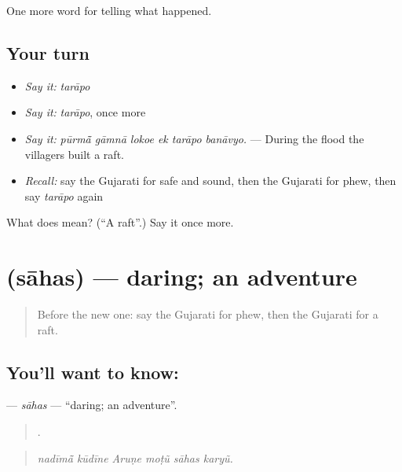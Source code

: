 \begin{grammarlens}[title={What you've built}]
One more word for telling what happened.
\end{grammarlens}

\subsection*{Your turn}
\begin{itemize}
\raggedright
  \item \emph{Say it:} \emph{tarāpo}
  \item \emph{Say it:} \emph{tarāpo}, once more
  \item \emph{Say it:} \emph{pūrmā̃ gāmnā lokoe ek tarāpo banāvyo.} — During the flood the villagers built a raft.
  \item \emph{Recall:} say the Gujarati for safe and sound, then the Gujarati for phew, then say \emph{tarāpo} again
\end{itemize}

\begin{tcolorbox}[breakable,colback=teal!4,colframe=teal!35!black,title={Before you move on}]
What does  mean? (\textquotedblleft{}A raft\textquotedblright{}.) Say it once more.
\end{tcolorbox}
\section[\texorpdfstring{\gu{સાહસ} (sāhas)}{સાહસ (sāhas)}]{ (sāhas) — daring; an adventure}

\label{lesson:GU-C308-sahas}



\begin{quote}
Before the new one: say the Gujarati for phew, then the Gujarati for a raft.
\end{quote}

\subsection*{You'll want to know: }
\textbf{} — \emph{sāhas} — \textquotedblleft{}daring; an adventure\textquotedblright{}.

\begin{quote}
     .
\end{quote}

\begin{quote}
\emph{nadīmā̃ kūdīne Aruṇe moṭũ sāhas karyũ.}
\end{quote}

